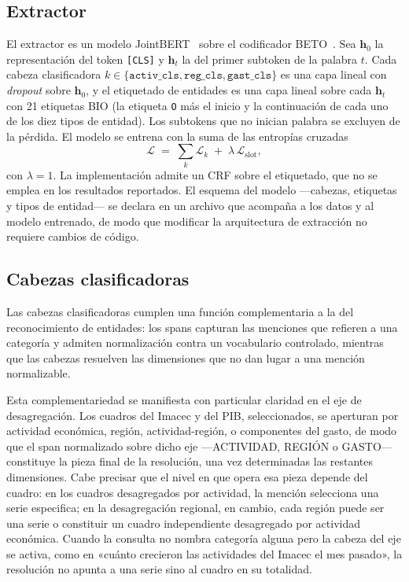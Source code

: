 \documentclass[11pt]{article}
\begin{document}
\subsection{Extractor}
\label{sec:extractor}

El extractor es un modelo JointBERT~\citep{chen2019bert} sobre el codificador
BETO~\citep{canete2020spanish}. Sea $\mathbf{h}_0$ la representación del token
\texttt{[CLS]} y $\mathbf{h}_t$ la del primer subtoken de la palabra $t$. Cada
cabeza clasificadora $k \in \{\texttt{activ\_cls}, \texttt{reg\_cls},
\texttt{gast\_cls}\}$ es una capa lineal con \textit{dropout} sobre
$\mathbf{h}_0$, y el etiquetado de entidades es una capa lineal sobre cada
$\mathbf{h}_t$ con 21 etiquetas BIO (la etiqueta \texttt{O} más el inicio y la
continuación de cada uno de los diez tipos de entidad). Los subtokens que no
inician palabra se excluyen de la pérdida. El modelo se entrena con la suma de las
entropías cruzadas
\[
  \mathcal{L} \;=\; \sum_{k} \mathcal{L}_{k} \;+\; \lambda\, \mathcal{L}_{\mathrm{slot}},
\]
con $\lambda = 1$. La implementación admite un CRF sobre el etiquetado, que no se
emplea en los resultados reportados. El esquema del modelo ---cabezas, etiquetas y
tipos de entidad--- se declara en un archivo que acompaña a los datos y al
modelo entrenado, de modo que modificar la arquitectura de extracción no requiere
cambios de código.

\subsection{Cabezas clasificadoras}
\label{sec:cabezas}

Las cabezas clasificadoras cumplen una función complementaria a la del reconocimiento de entidades: los spans capturan las menciones que refieren a una categoría y admiten normalización contra un vocabulario controlado, mientras que las cabezas resuelven las dimensiones que no dan lugar a una mención normalizable.

Esta complementariedad se manifiesta con particular claridad en el eje de desagregación. Los cuadros del Imacec y del PIB, seleccionados, se aperturan por actividad económica, región, actividad-región, o componentes del gasto, de modo que el span normalizado sobre dicho eje ---ACTIVIDAD, REGIÓN o GASTO--- constituye la pieza final de la resolución, una vez determinadas las restantes dimensiones. Cabe precisar que el nivel en que opera esa pieza depende del cuadro: en los cuadros desagregados por actividad, la mención selecciona una serie especifica; en la desagregación regional, en cambio, cada región puede ser una serie o constituir un cuadro independiente desagregado por actividad económica. Cuando la consulta no nombra categoría alguna pero la cabeza del eje se activa, como en «cuánto crecieron las actividades del Imacec el mes pasado», la resolución no apunta a una serie sino al cuadro en su totalidad.
\end{document}
